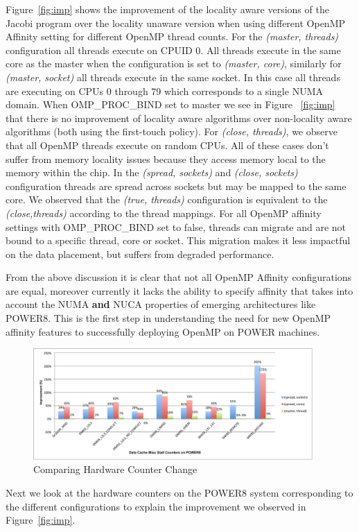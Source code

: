 Figure~\ref{fig:imp} shows the improvement of the locality aware versions of the Jacobi program over the locality unaware version when using different OpenMP Affinity setting for different OpenMP thread counts. 
For the \textit{(master, threads)} configuration all threads execute on CPUID 0. 
All threads execute in the same core as the master when the configuration is set to \textit{(master, core)}, similarly for \textit{(master, socket)} all threads execute in the same socket. In this case all threads are executing on CPUs 0 through 79 which corresponds to a single NUMA domain. When OMP\_PROC\_BIND set to master we see in Figure ~\ref{fig:imp} that there is no improvement of locality aware algorithms over non-locality aware algorithms (both using the first-touch policy).
For \textit{(close, threads)}, we observe that all OpenMP threads execute on random CPUs. %
All of these cases don't suffer from memory locality issues because they access memory local to the memory within the chip.
In the \textit{(spread, sockets)} and \textit{(close, sockets)} configuration threads are spread across sockets but may be mapped to the same core. We observed that the \textit{(true, threads)} configuration is equivalent to the \textit{(close,threads)} according to the thread mappings.
For all OpenMP affinity settings  with OMP\_PROC\_BIND set to false, threads can migrate and are not bound to a specific thread, core or socket. This migration makes it less impactful on the data placement, but suffers from degraded performance.

From the above discussion it is clear that not all OpenMP Affinity configurations are equal, moreover currently it lacks the ability to specify affinity that takes into account the NUMA \textbf{and} NUCA properties of emerging architectures like POWER8. This is the first step in understanding the need for new OpenMP affinity features to successfully deploying OpenMP on POWER machines. %
\begin{figure}[h!]
  \centering
  \includegraphics[height=0.4\textwidth, width=0.95\textwidth]{./Images/HW.pdf}
       \caption{Comparing Hardware Counter Change}
       \label{fig:HW}
\end{figure}
%
Next we look at the hardware counters on the POWER8 system corresponding to the different configurations to explain the improvement we observed in Figure~\ref{fig:imp}.

